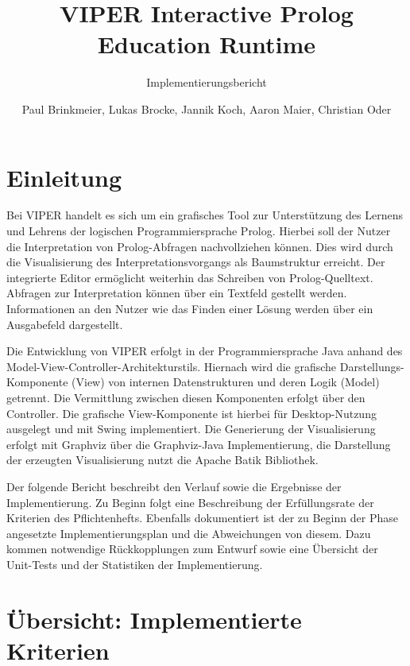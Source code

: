 \documentclass[parskip=full,11pt,twoside]{scrartcl}
\title{VIPER Interactive Prolog Education Runtime}
\subtitle{Implementierungsbericht}
\author{Paul Brinkmeier, Lukas Brocke, Jannik Koch, Aaron Maier, Christian Oder}
\begin{document}
\maketitle
\tableofcontents

\section{Einleitung}
\setcounter{page}{1}

Bei VIPER handelt es sich um ein grafisches Tool zur Unterstützung des Lernens und Lehrens der logischen Programmiersprache Prolog. Hierbei soll der Nutzer die Interpretation von Prolog-Abfragen nachvollziehen können. Dies wird durch die Visualisierung des Interpretationsvorgangs als Baumstruktur erreicht. Der integrierte Editor ermöglicht weiterhin das Schreiben von Prolog-Quelltext. Abfragen zur Interpretation können über ein Textfeld gestellt werden. Informationen an den Nutzer wie das Finden einer Lösung werden über ein Ausgabefeld dargestellt.

Die Entwicklung von VIPER erfolgt in der Programmiersprache Java anhand des Model-View-Controller-Architekturstils. Hiernach wird die grafische Darstellungs-Komponente (View) von internen Datenstrukturen und deren Logik (Model) getrennt. Die Vermittlung zwischen diesen Komponenten erfolgt über den Controller. Die grafische View-Komponente ist hierbei für Desktop-Nutzung ausgelegt und mit Swing implementiert. Die Generierung der Visualisierung erfolgt mit Graphviz über die Graphviz-Java Implementierung, die Darstellung der erzeugten Visualisierung nutzt die Apache Batik Bibliothek.

Der folgende Bericht beschreibt den Verlauf sowie die Ergebnisse der Implementierung. Zu Beginn folgt eine Beschreibung der Erfüllungsrate der Kriterien des Pflichtenhefts. Ebenfalls dokumentiert ist der zu Beginn der Phase angesetzte Implementierungsplan und die Abweichungen von diesem. Dazu kommen notwendige Rückkopplungen zum Entwurf sowie eine Übersicht der Unit-Tests und der Statistiken der Implementierung.

\section{Übersicht: Implementierte Kriterien}
\end{document}
